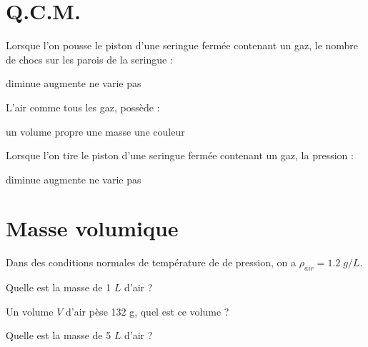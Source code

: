 \documentclass[a4paper,11pt]{exam}
\begin{document}
\newpage

\section{Q.C.M.}
	\begin{questions}
		\question Lorsque l'on pousse le piston d'une seringue fermée contenant un gaz, le nombre de chocs sur les parois de la seringue :\\
			\begin{oneparcheckboxes}
				\choice diminue
				\correctchoice augmente
				\choice ne varie pas
			\end{oneparcheckboxes}
		
		\question L'air comme tous les gaz, possède :\\
			\begin{oneparcheckboxes}
				\choice un volume propre
				\correctchoice une masse
				\choice une couleur
			\end{oneparcheckboxes}
		
		\question Lorsque l'on tire le piston d'une seringue fermée contenant un gaz, la pression :\\
		\begin{oneparcheckboxes}
			\correctchoice diminue
			\choice augmente
			\choice ne varie pas			
		\end{oneparcheckboxes}
	\end{questions}
%
\section{Masse volumique}

Dans des conditions normales de température de de pression, on a $\rho _{air}=\num{1.2}\; g/L$.

\begin{questions}
	\question Quelle est la masse de 1 $L$ d'air ?
	\fillwithdottedlines{1cm}
	
	\question Un volume $V$ d'air pèse 132 g, quel est ce volume ?
	\fillwithdottedlines{2cm}
	
	\question Quelle est la masse de 5 $L$ d'air ?
	\fillwithdottedlines{2cm}
\end{questions}
\ \label{LastPage}
\end{document}
